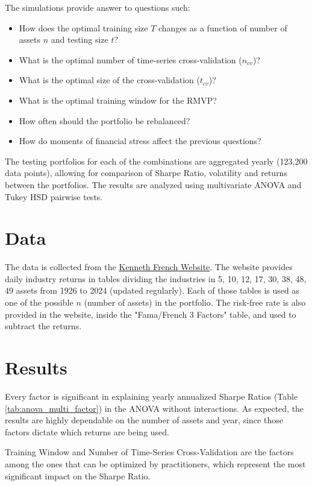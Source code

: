 \documentclass{article}
\begin{document}
The simulations provide answer to questions such:
\begin{itemize}
    \item How does the optimal training size $T$ changes as a function of number of assets $n$ and testing size $t$?
    \item What is the optimal number of time-series cross-validation ($n_{cv}$)?
    \item What is the optimal size of the cross-validation ($t_{cv}$)?
    \item What is the optimal training window for the RMVP?
    \item How often should the portfolio be rebalanced?
    \item How do moments of financial stress affect the previous questions?
\end{itemize}

The testing portfolios for each of the combinations are aggregated yearly (123,200 data points), allowing for comparison of Sharpe Ratio, volatility and returns between the portfolios. The results are analyzed using multivariate ANOVA and Tukey HSD pairwise tests.

\section{Data}
The data is collected from the \hyperlink{https://mba.tuck.dartmouth.edu/pages/faculty/ken.french/data_library.html}{Kenneth French Website}. The website provides daily industry returns in tables dividing the industries in 5, 10, 12, 17, 30, 38, 48, 49 assets from 1926 to 2024 (updated regularly). Each of those tables is used as one of the possible $n$ (number of assets) in the portfolio. The risk-free rate is also provided in the website, inside the "Fama/French 3 Factors" table, and used to subtract the returns.

\section{Results}
Every factor is significant in explaining yearly annualized Sharpe Ratios (Table \ref{tab:anova_multi_factor}) in the ANOVA without interactions. As expected, the results are highly dependable on the number of assets and year, since those factors dictate which returns are being used.

Training Window and Number of Time-Series Cross-Validation are the factors among the ones that can be optimized by practitioners, which represent the most significant impact on the Sharpe Ratio.
\end{document}
